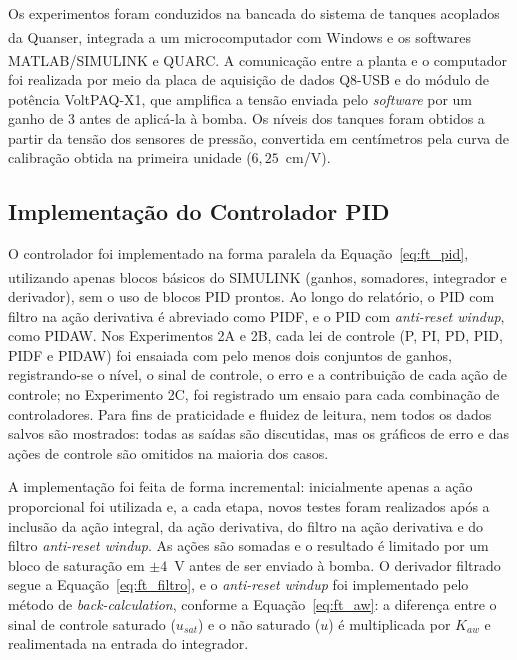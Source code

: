 \documentclass[a4paper,12pt]{article}
\begin{document}
\begin{justify}
    \hspace{4ex}Os experimentos foram conduzidos na bancada do sistema de tanques acoplados da Quanser\textsuperscript{\textregistered}, integrada a um microcomputador com Windows e os softwares MATLAB\textsuperscript{\textregistered}/SIMULINK\textsuperscript{\textregistered} e QUARC\textsuperscript{\textregistered}. A comunicação entre a planta e o computador foi realizada por meio da placa de aquisição de dados Q8-USB e do módulo de potência VoltPAQ-X1, que amplifica a tensão enviada pelo \textit{software} por um ganho de 3 antes de aplicá-la à bomba. Os níveis dos tanques foram obtidos a partir da tensão dos sensores de pressão, convertida em centímetros pela curva de calibração obtida na primeira unidade ($6{,}25$~cm/V).
\end{justify}

\subsection{Implementação do Controlador PID}

\begin{justify}
    \hspace{4ex}O controlador foi implementado na forma paralela da Equação~\eqref{eq:ft_pid}, utilizando apenas blocos básicos do SIMULINK\textsuperscript{\textregistered} (ganhos, somadores, integrador e derivador), sem o uso de blocos PID prontos. Ao longo do relatório, o PID com filtro na ação derivativa é abreviado como PIDF, e o PID com \textit{anti-reset windup}, como PIDAW. Nos Experimentos 2A e 2B, cada lei de controle (P, PI, PD, PID, PIDF e PIDAW) foi ensaiada com pelo menos dois conjuntos de ganhos, registrando-se o nível, o sinal de controle, o erro e a contribuição de cada ação de controle; no Experimento 2C, foi registrado um ensaio para cada combinação de controladores. Para fins de praticidade e fluidez de leitura, nem todos os dados salvos são mostrados: todas as saídas são discutidas, mas os gráficos de erro e das ações de controle são omitidos na maioria dos casos.
\end{justify}

\begin{justify}
    \hspace{4ex}A implementação foi feita de forma incremental: inicialmente apenas a ação proporcional foi utilizada e, a cada etapa, novos testes foram realizados após a inclusão da ação integral, da ação derivativa, do filtro na ação derivativa e do filtro \textit{anti-reset windup}. As ações são somadas e o resultado é limitado por um bloco de saturação em $\pm 4$~V antes de ser enviado à bomba. O derivador filtrado segue a Equação~\eqref{eq:ft_filtro}, e o \textit{anti-reset windup} foi implementado pelo método de \textit{back-calculation}, conforme a Equação~\eqref{eq:ft_aw}: a diferença entre o sinal de controle saturado ($u_{sat}$) e o não saturado ($u$) é multiplicada por $K_{aw}$ e realimentada na entrada do integrador.
\end{justify}
\end{document}
